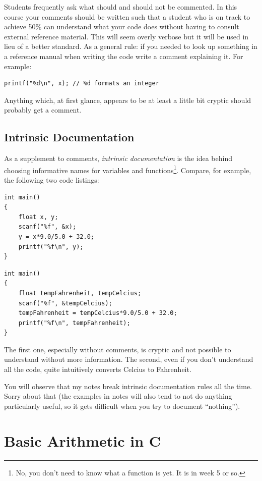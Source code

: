 \documentclass{lab}
\begin{document}
Students frequently ask what should and should not be commented. In this course your comments should be written such that a student who is on track to achieve 50\% can understand what your code does without having to consult external reference material. This will seem overly verbose but it will be used in lieu of a better standard. As a general rule: if you needed to look up something in a reference manual when writing the code write a comment explaining it. For example:

\begin{lstlisting}[style=CStyle]
printf("%d\n", x); // %d formats an integer
\end{lstlisting}

Anything which, at first glance, appears to be at least a little bit cryptic should probably get a comment.

\pagebreak
\subsection{Intrinsic Documentation}

As a supplement to comments, \textit{intrinsic documentation} is the idea behind choosing informative names for variables and functions\footnote{No, you don't need to know what a function is yet. It is in week 5 or so.}. Compare, for example, the following two code listings:

\begin{lstlisting}[style=CStyle]
int main()
{
	float x, y;
	scanf("%f", &x);
	y = x*9.0/5.0 + 32.0;
	printf("%f\n", y);
}
\end{lstlisting}

\begin{lstlisting}[style=CStyle]
int main()
{
	float tempFahrenheit, tempCelcius;
	scanf("%f", &tempCelcius);
	tempFahrenheit = tempCelcius*9.0/5.0 + 32.0;
	printf("%f\n", tempFahrenheit);
}
\end{lstlisting}

The first one, especially without comments, is cryptic and not possible to understand without more information. The second, even if you don't understand all the code, quite intuitively converts Celcius to Fahrenheit.

You will observe that my notes break intrinsic documentation rules all the time. Sorry about that (the examples in notes will also tend to not do anything particularly useful, so it gets difficult when you try to document ``nothing'').

\pagebreak
\section{Basic Arithmetic in C}
\end{document}
